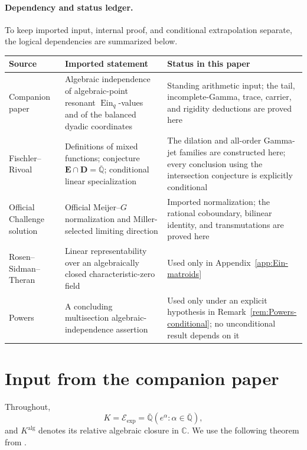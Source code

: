 \documentclass[11pt]{article}
\theoremstyle{definition}
\theoremstyle{remark}
\newcommand{\Qbar}{\overline{\mathbb Q}}
\newcommand{\C}{\mathbb C}
\newcommand{\Ein}{\operatorname{Ein}}
\newcommand{\Eexp}{\mathcal E_{\mathrm{exp}}}
\begin{document}
\paragraph{Dependency and status ledger.}
To keep imported input, internal proof, and conditional extrapolation
separate, the logical dependencies are summarized below.
\begin{center}
\small
\begin{tabular}{@{}
 >{\raggedright\arraybackslash}p{}
 >{\raggedright\arraybackslash}p{}
 >{\raggedright\arraybackslash}p{}@{}}
\toprule
Source & Imported statement & Status in this paper\\
\midrule
Companion paper \cite[Thms.~1.4, 5.1 and Lem.~11.2]{KEIO2026I}
& Algebraic independence of algebraic-point resonant \(\Ein_q\)-values
and of the balanced dyadic coordinates
& Standing arithmetic input; the tail, incomplete-Gamma, trace, carrier,
and rigidity deductions are proved here\\
Fischler--Rivoal \cite{FischlerRivoalMixed2024}
& Definitions of mixed functions; conjecture
\(\mathbf E\cap\mathbf D=\Qbar\); conditional linear specialization
& The dilation and all-order Gamma-jet families are constructed here;
every conclusion using the intersection conjecture is explicitly
conditional\\
Official Challenge solution \cite[\S5.2]{RamanujanOfficial2026}
& Official Meijer--\(G\) normalization and Miller-selected limiting direction
& Imported normalization; the rational coboundary, bilinear identity, and
transmutations are proved here\\
Rosen--Sidman--Theran \cite[Thm.~1.10]{RosenSidmanTheran2025}
& Linear representability over an algebraically closed characteristic-zero
field
& Used only in Appendix~\ref{app:Ein-matroids}\\
Powers \cite[\S5]{Powers2025}
& A concluding multisection algebraic-independence assertion
& Used only under an explicit hypothesis in
Remark~\ref{rem:Powers-conditional}; no unconditional result depends on it\\
\bottomrule
\end{tabular}
\end{center}

\section{Input from the companion paper}
\label{sec:input}

Throughout,
\[
 K=\Eexp=\Qbar(e^\alpha:\alpha\in\Qbar),
\]
and \(K^{\mathrm{alg}}\) denotes its relative algebraic closure in \(\C\).
We use the following theorem from \cite[Thm.~5.1]{KEIO2026I}.
\end{document}
